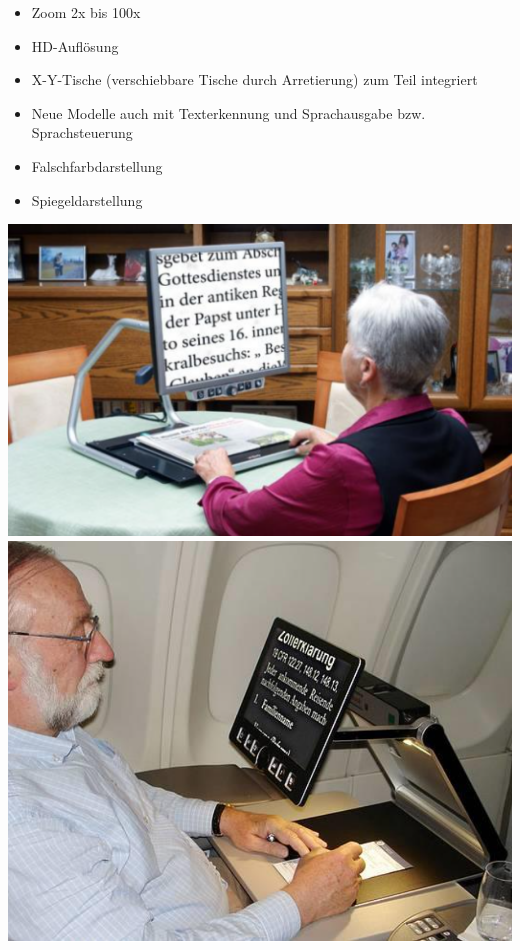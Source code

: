 \documentclass[paper=a4, fontsize=11pt]{scrartcl} %
\numberwithin{equation}{section} %
\numberwithin{figure}{section} %
\numberwithin{table}{section} %
\begin{document}
\begin{itemize}
\begin{minipage}[c]{0.55\textwidth}
\begin{itemize}
\item Zoom 2x bis 100x
\item HD-Auflösung
\item X-Y-Tische (verschiebbare Tische durch Arretierung) zum Teil integriert
\item Neue Modelle auch mit Texterkennung und Sprachausgabe bzw. Sprachsteuerung
\item Falschfarbdarstellung
\item Spiegeldarstellung
\end{itemize}
\end{minipage}
\begin{minipage}[c]{0.3\textwidth}
\includegraphics[width=\textwidth]{imgs/bildschirmleser}
\includegraphics[width=\textwidth]{imgs/bildschirmleser2}
\end{minipage}

\end{itemize}
\end{document}
